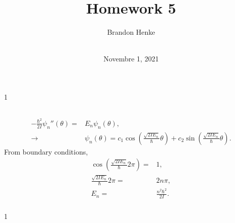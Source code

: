 \documentclass[a4paper,12pt,twoside]{article}
\title{Homework 5}
\author{
	Brandon Henke\\
	\textit{\course}\\
	\textit{\professor}
}
\date{Novembre 1, 2021}
\newcommand{\mcols}{0}
\begin{document}

\maketitle
\if\mcols1
\begin{multicols*}{2}
\fi

\setcounter{section}{5}
\subsection{}
\subsubsection{}
\begin{align}
	-\frac{\hbar^2}{2I}\psi_n''(\theta) =& E_n \psi_n(\theta),\\
	\rightarrow& \psi_n(\theta) = c_1 \cos(\frac{\sqrt{2IE_n}}{\hbar}\theta) + c_2 \sin(\frac{\sqrt{2IE_n}}{\hbar}\theta).
\end{align}
From boundary conditions,
\begin{align}
	\cos(\frac{\sqrt{2IE_n}}{\hbar}2\pi) =& 1,\\
	\frac{\sqrt{2IE_n}}{\hbar}2\pi =& 2n\pi,\\
	E_n =& \frac{n^2\hbar^2}{2I}.
\end{align}
\subsubsection{}


\printBib


\if\mcols1
\end{multicols*}
\fi
\end{document}
